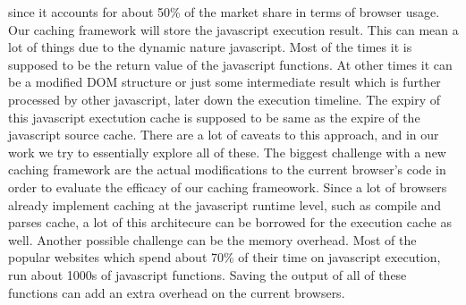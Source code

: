 since it accounts for about 50\% of the market share in terms of
browser usage. Our caching framework will store the javascript
execution result. This can mean a lot of things due to the dynamic
nature javascript. Most of the times it is supposed to be the return
value of the javascript functions. At other times it can be a modified
DOM structure or just some intermediate result which is further
processed by other javascript, later down the execution timeline.  The
expiry of this javascript exectution cache is supposed to be same as
the expire of the javascript source cache.  There are a lot of caveats
to this approach, and in our work we try to essentially explore all of
these.  The biggest challenge with a new caching framework are the
actual modifications to the current browser's code in order to
evaluate the efficacy of our caching frameowork. Since a lot of
browsers already implement caching at the javascript runtime level,
such as compile and parses cache, a lot of this architecure can be
borrowed for the execution cache as well.  Another possible challenge
can be the memory overhead. Most of the popular websites which spend
about 70\% of their time on javascript execution, run about 1000s of
javascript functions. Saving the output of all of these functions can
add an extra overhead on the current browsers. 
